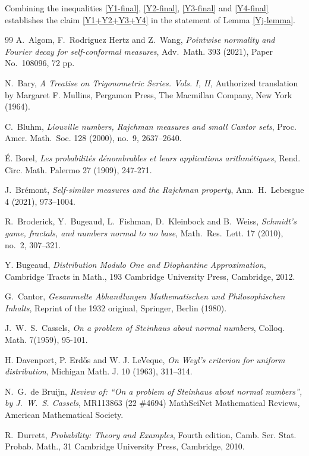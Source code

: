 \documentclass[12pt, twoside]{article}
\theoremstyle{definition}
\numberwithin{equation}{section}
\begin{document}
\vskip0.1in
\noindent Combining the inequalities \eqref{Y1-final}, \eqref{Y2-final}, \eqref{Y3-final} and \eqref{Y4-final} establishes the claim \eqref{Y1+Y2+Y3+Y4} in the statement of Lemma \ref{Yj-lemma}. 
\begin{thebibliography}{99}
A.~Algom, F.~Rodriguez Hertz and Z.~Wang,  
{\em{Pointwise normality and Fourier decay for self-conformal measures}}, 
Adv.~Math. 393 (2021), Paper No.~108096, 72 pp. 

N.~Bary, 
{\em{A Treatise on Trigonometric Series. Vols. I, II,}}
Authorized translation by Margaret F. Mullins, Pergamon Press, 
The Macmillan Company, New York (1964).

C.~Bluhm, 
{\em{Liouville numbers, Rajchman measures and small Cantor sets}}, 
Proc. Amer. Math.~Soc. 128 (2000), no.~9, 2637--2640.

\'{E}. Borel,
{\em{Les probabilit\'{e}s d\'{e}nombrables et leurs applications arithm\'{e}tiques}},
Rend. Circ. Math. Palermo 27 (1909), 247-271.

J.~Br\'emont, 
{\em{Self-similar measures and the Rajchman property}}, 
Ann.~H.~Lebesgue 4 (2021), 973--1004. 
	
R.~Broderick, Y.~Bugeaud, L.~Fishman, D.~Kleinbock and B.~Weiss, 
{\em{Schmidt's game, fractals, and numbers normal to no base}},
Math.~Res.~Lett. 17 (2010), no.~2, 307--321.  	
	
Y. Bugeaud, 
{\em{Distribution Modulo One and Diophantine Approximation}},
Cambridge Tracts in Math., 193 Cambridge University Press, Cambridge, 2012.

G.~Cantor, 
{\em{Gesammelte Abhandlungen Mathematischen und Philosophischen Inhalts}}, 
Reprint of the 1932 original, Springer, Berlin (1980).

J.~W.~S.~Cassels, 
{\em{On a problem of Steinhaus about normal numbers}},
Colloq. Math. 7(1959), 95-101.

H. Davenport, P. Erd\H{o}s and W. J. LeVeque, 
{\em{On Weyl's criterion for uniform distribution}},
Michigan Math. J. 10 (1963), 311--314.

N.~G.~de Bruijn, {\em{Review of: ``On a problem of Steinhaus about normal numbers'', by J.~W.~S. Cassels}}, MR113863 (22 \#4694) MathSciNet Mathematical Reviews, American Mathematical Society.  

R.~Durrett, 
{\em{Probability: Theory and Examples}},
Fourth edition, Camb. Ser. Stat. Probab. Math., 31
Cambridge University Press, Cambridge, 2010.  


\end{thebibliography}
\end{document}
